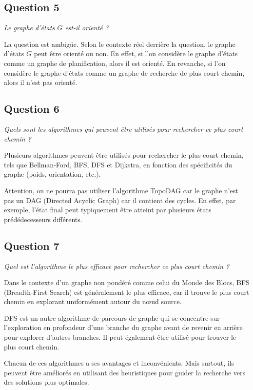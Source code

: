 \subsection{Question 5}

\textit{Le graphe d'états $G$ est-il orienté ?}

La question est ambigüe. Selon le contexte réel derrière la question, le graphe d'états $G$ peut être orienté ou non. En effet, si l'on considère le graphe d'états comme un graphe de planification, alors il est orienté. En revanche, si l'on considère le graphe d'états comme un graphe de recherche de plus court chemin, alors il n'est pas orienté.

\subsection{Question 6}

\textit{Quels sont les algorithmes qui peuvent être utilisés pour rechercher ce plus court chemin ?}

Plusieurs algorithmes peuvent être utilisés pour rechercher le plus court chemin, tels que Bellman-Ford, BFS, DFS et Dijkstra, en fonction des spécificités du graphe (poids, orientation, etc.).

Attention, on ne pourra pas utiliser l'algorithme TopoDAG car le graphe n'est pas un DAG (Directed Acyclic Graph) car il contient des cycles. En effet, par exemple, l'état final peut typiquement être atteint par plusieurs états prédédecesseurs différents.

\subsection{Question 7}

\textit{Quel est l'algorithme le plus efficace pour rechercher ce plus court chemin ?}

Dans le contexte d'un graphe non pondéré comme celui du Monde des Blocs, BFS (Breadth-First Search) est généralement le plus efficace, car il trouve le plus court chemin en explorant uniformément autour du nœud source.

DFS est un autre algorithme de parcours de graphe qui se concentre sur l'exploration en profondeur d'une branche du graphe avant de revenir en arrière pour explorer d'autres branches. Il peut également être utilisé pour trouver le plus court chemin. 

Chacun de ces algorithmes a ses avantages et inconvénients. Mais surtout, ils peuvent être améliorés en utilisant des heuristiques pour guider la recherche vers des solutions plus optimales.

